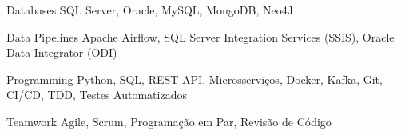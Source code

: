 


\begin{cvskills}


\cvskill
{Databases} %
{SQL Server, Oracle, MySQL, MongoDB, Neo4J} %

\cvskill
{Data Pipelines} %
{Apache Airflow, SQL Server Integration Services (SSIS), Oracle Data Integrator (ODI)} %

\cvskill
{Programming} %
{Python, SQL, REST API, Microsserviços, Docker, Kafka, Git, CI/CD, TDD, Testes Automatizados} %


\cvskill
{Teamwork} %
{Agile, Scrum, Programação em Par, Revisão de Código} %


\end{cvskills}